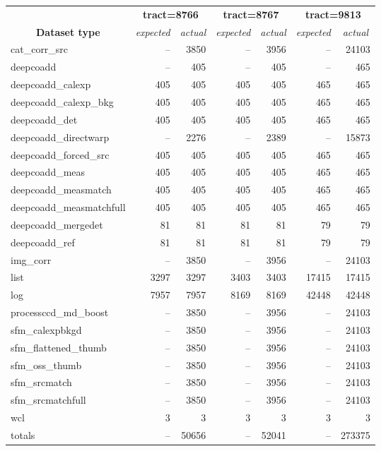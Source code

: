 \begin{table}[h]
	\caption{
		File counts. Expected values came from corresponding weekly RC
		exections. Symbol \dag{} dentoes dataset types which differs from
		weekly execution and \ddag{} indicates DESDM specific dataset types.
	}
	\label{tab:count}
	\small
	\begin{longtable}{lrrrrrr}
		\hline\hline
		                                          &
		\multicolumn{2}{c}{\textbf{tract=8766}}   &
		\multicolumn{2}{c}{\textbf{tract=8767}}   &
		\multicolumn{2}{c}{\textbf{tract=9813}}   \\
		\multicolumn{1}{c}{\textbf{Dataset type}} &
		\multicolumn{1}{c}{\textit{expected}}     &
		\multicolumn{1}{c}{\textit{actual}}       &
		\multicolumn{1}{c}{\textit{expected}}     &
		\multicolumn{1}{c}{\textit{actual}}       &
		\multicolumn{1}{c}{\textit{expected}}     &
		\multicolumn{1}{c}{\textit{actual}}       \\
		\hline\hline
		cat\_corr\_src\dag & -- & 3850 & -- & 3956 & -- & 24103 \\
		deepcoadd\dag & -- & 405 & -- & 405 & -- & 465 \\
		deepcoadd\_calexp & 405 & 405 & 405 & 405 & 465 & 465 \\
		deepcoadd\_calexp\_bkg & 405 & 405 & 405 & 405 & 465 & 465 \\
		deepcoadd\_det & 405 & 405 & 405 & 405 & 465 & 465 \\
		deepcoadd\_directwarp & --  & 2276 & -- & 2389 & -- & 15873 \\
		deepcoadd\_forced\_src & 405 & 405 & 405 & 405 & 465 & 465 \\
		deepcoadd\_meas & 405 & 405 & 405 & 405 & 465 & 465 \\
		deepcoadd\_measmatch & 405 & 405 & 405 & 405 & 465 & 465 \\
		deepcoadd\_measmatchfull & 405 & 405 & 405 & 405 & 465 & 465 \\
		deepcoadd\_mergedet & 81 & 81 & 81 & 81 & 79 & 79 \\
		deepcoadd\_ref & 81 & 81 & 81 & 81 & 79 & 79 \\
		img\_corr\dag & -- & 3850 & -- & 3956 & -- & 24103 \\
		list\ddag & 3297 & 3297 & 3403 & 3403 & 17415 & 17415 \\
		log\ddag & 7957 & 7957 & 8169 & 8169 & 42448 & 42448 \\
		processccd\_md\_boost & -- & 3850 & -- & 3956 & -- & 24103 \\
		sfm\_calexpbkgd & -- & 3850 & -- & 3956 & -- & 24103 \\
		sfm\_flattened\_thumb & -- & 3850 & -- & 3956 & -- & 24103 \\
		sfm\_oss\_thumb & -- & 3850 & -- & 3956 & -- & 24103 \\
		sfm\_srcmatch & -- & 3850 & -- & 3956 & -- & 24103 \\
		sfm\_srcmatchfull & -- & 3850 & -- & 3956 & -- & 24103 \\
		wcl\ddag & 3 & 3 & 3 & 3 & 3 & 3 \\
		\hline
		totals & -- & 50656 & -- & 52041 & -- & 273375 \\
		\hline\hline
	\end{longtable}
\end{table}
